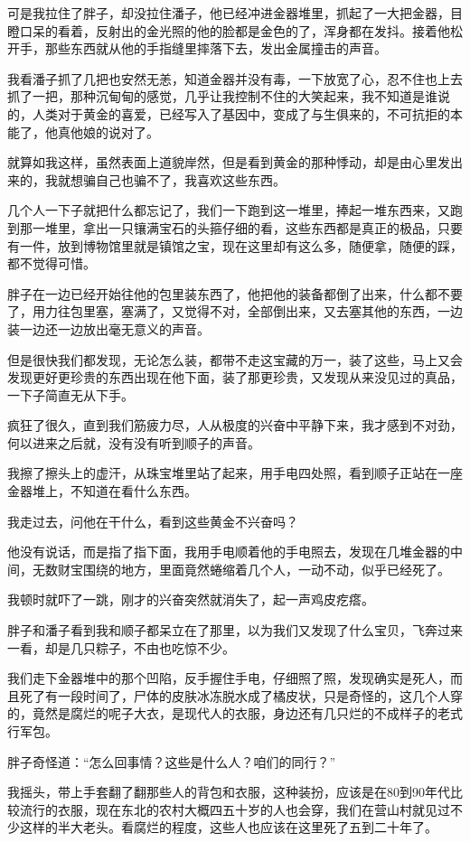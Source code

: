可是我拉住了胖子，却没拉住潘子，他已经冲进金器堆里，抓起了一大把金器，目瞪口呆的看着，反射出的金光照的他的脸都是金色的了，浑身都在发抖。接着他松开手，那些东西就从他的手指缝里摔落下去，发出金属撞击的声音。

我看潘子抓了几把也安然无恙，知道金器并没有毒，一下放宽了心，忍不住也上去抓了一把，那种沉甸甸的感觉，几乎让我控制不住的大笑起来，我不知道是谁说的，人类对于黄金的喜爱，已经写入了基因中，变成了与生俱来的，不可抗拒的本能了，他真他娘的说对了。

就算如我这样，虽然表面上道貌岸然，但是看到黄金的那种悸动，却是由心里发出来的，我就想骗自己也骗不了，我喜欢这些东西。

几个人一下子就把什么都忘记了，我们一下跑到这一堆里，捧起一堆东西来，又跑到那一堆里，拿出一只镶满宝石的头箍仔细的看，这些东西都是真正的极品，只要有一件，放到博物馆里就是镇馆之宝，现在这里却有这么多，随便拿，随便的踩，都不觉得可惜。

胖子在一边已经开始往他的包里装东西了，他把他的装备都倒了出来，什么都不要了，用力往包里塞，塞满了，又觉得不对，全部倒出来，又去塞其他的东西，一边装一边还一边放出毫无意义的声音。

但是很快我们都发现，无论怎么装，都带不走这宝藏的万一，装了这些，马上又会发现更好更珍贵的东西出现在他下面，装了那更珍贵，又发现从来没见过的真品，一下子简直无从下手。

疯狂了很久，直到我们筋疲力尽，人从极度的兴奋中平静下来，我才感到不对劲，何以进来之后就，没有没有听到顺子的声音。

我擦了擦头上的虚汗，从珠宝堆里站了起来，用手电四处照，看到顺子正站在一座金器堆上，不知道在看什么东西。

我走过去，问他在干什么，看到这些黄金不兴奋吗？

他没有说话，而是指了指下面，我用手电顺着他的手电照去，发现在几堆金器的中间，无数财宝围绕的地方，里面竟然蜷缩着几个人，一动不动，似乎已经死了。

我顿时就吓了一跳，刚才的兴奋突然就消失了，起一声鸡皮疙瘩。

胖子和潘子看到我和顺子都呆立在了那里，以为我们又发现了什么宝贝，飞奔过来一看，却是几只粽子，不由也吃惊不少。

我们走下金器堆中的那个凹陷，反手握住手电，仔细照了照，发现确实是死人，而且死了有一段时间了，尸体的皮肤冰冻脱水成了橘皮状，只是奇怪的，这几个人穿的，竟然是腐烂的呢子大衣，是现代人的衣服，身边还有几只烂的不成样子的老式行军包。

胖子奇怪道：“怎么回事情？这些是什么人？咱们的同行？”

我摇头，带上手套翻了翻那些人的背包和衣服，这种装扮，应该是在80到90年代比较流行的衣服，现在东北的农村大概四五十岁的人也会穿，我们在营山村就见过不少这样的半大老头。看腐烂的程度，这些人也应该在这里死了五到二十年了。


